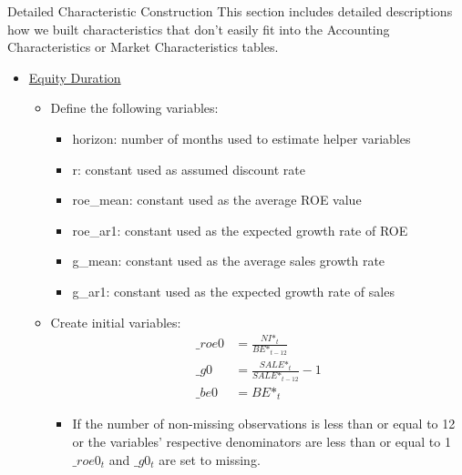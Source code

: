 \documentclass[12pt,title,fleqn]{article}
\begin{document}
\begin{section}{Detailed Characteristic Construction}
    This section includes detailed descriptions how we built characteristics that don't easily fit into the Accounting Characteristics or Market Characteristics tables. 
    \begin{itemize}
        \item \hyperlink{eq_dur2}{\hypertarget{eq_dur}{Equity Duration}}
            \begin{itemize}
                \item Define the following variables:
                \begin{itemize}
                    \item horizon: number of months used to estimate helper variables
                    \item r: constant used as assumed discount rate
                    \item roe\_mean: constant used as the average ROE value
                    \item roe\_ar1: constant used as the expected growth rate of ROE
                    \item g\_mean: constant used as the average sales growth rate
                    \item g\_ar1: constant used as the expected growth rate of sales
                \end{itemize}
                \item Create initial variables:   
                    \begin{align*}
                        \_roe0 &= \frac{NI\mbox{*}_t}{BE\mbox{*}_{t-12}} \\
                        \_g0 &= \frac{SALE\mbox{*}_t}{SALE\mbox{*}_{t-12}} - 1 \\
                        \_be0 &= BE\mbox{*}_t
                    \end{align*}
                    \begin{itemize}
                        \item If the number of non-missing observations is less than or equal to 12 or the variables' respective denominators are less than or equal to 1 $\_roe0_t$ and $\_g0_t$ are set to missing. 
                    \end{itemize}
                

\end{itemize}
\end{itemize}
\end{section}
\end{document}
